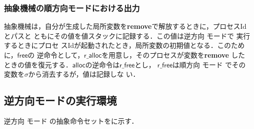 \documentclass[submit,PRO]{ipsj}
\newcommand{\bcode}[1]{$\mathsf{#1}$}
\begin{document}
\subsubsection{抽象機械の順方向モードにおける出力}

抽象機械は，自分が生成した局所変数を{\bf remove}で解放するときに，プロセスIdとパスと
ともにその値を値スタックに記録する．この値は逆方向%
モードで%
実行するときにプロセ
スIdが起動されたとき，局所変数の初期値となる．このために，\bcode{free}の
逆命令として，\bcode{r\_alloc}を用意し，そのプロセスが変数を{\bf remove}
したときの値を復元する．\bcode{alloc}の逆命令は\bcode{r\_free}とし，
\bcode{r\_free}は順方向%
モード%
でその変数を$\sigma$から消去するが，値は記録しな
い．

\subsection{逆方向モードの実行環境}


逆方向%
モード%
の抽象命令セットをに示す．
\end{document}
